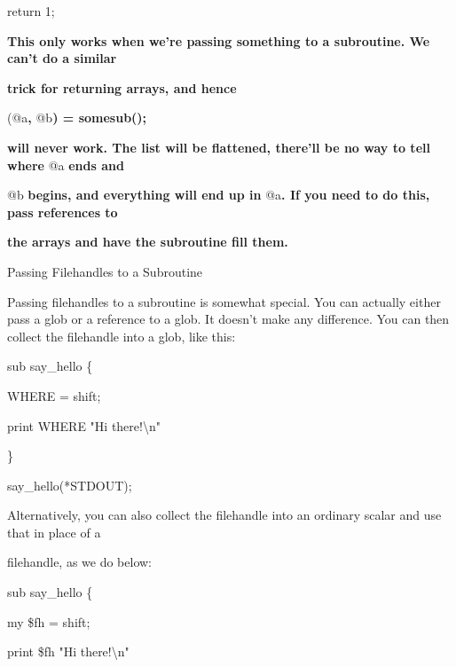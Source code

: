 \documentclass[a4paper,11pt]{book}
\begin{document}
\noindent 

\noindent return 1;

\noindent 

\noindent 

\noindent \textbf{This only works when we're passing something to a subroutine. We can't do a similar}

\noindent \textbf{trick for returning arrays, and hence}

\noindent 

\noindent (@a\textbf{, }@b\textbf{) = somesub();}

\noindent 

\noindent \textbf{will never work. The list will be flattened, there'll be no way to tell where }@a\textbf{ ends and}

\noindent @b\textbf{ begins, and everything will end up in }@a\textbf{. If you need to do this, pass references to}

\noindent \textbf{the arrays and have the subroutine fill them.}

\noindent 

\noindent 

\noindent Passing Filehandles to a Subroutine

\noindent 

\noindent Passing  filehandles to  a subroutine  is  somewhat  special.  You  can  actually  either  pass  a  glob or  a reference to  a glob.  It doesn't  make  any  difference.  You  can  then  collect  the  filehandle  into  a  glob, like this:

\noindent 

\noindent sub say\_hello \{

\noindent *WHERE = shift;

\noindent print WHERE "Hi there!\textbackslash n"

\noindent \}

\noindent say\_hello(*STDOUT);

\noindent 

\noindent 

\noindent Alternatively, you can also collect the filehandle into an ordinary scalar and use that in place of a

\noindent filehandle, as we do below:

\noindent 

\noindent sub say\_hello \{

\noindent my \$fh = shift;

\noindent print \$fh "Hi there!\textbackslash n"
\end{document}

